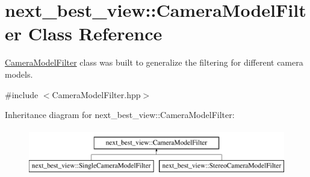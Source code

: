\hypertarget{classnext__best__view_1_1CameraModelFilter}{\section{next\-\_\-best\-\_\-view\-:\-:\-Camera\-Model\-Filter \-Class \-Reference}
\label{classnext__best__view_1_1CameraModelFilter}
}


\hyperlink{classnext__best__view_1_1CameraModelFilter}{\-Camera\-Model\-Filter} class was built to generalize the filtering for different camera models.  




{\ttfamily \#include $<$\-Camera\-Model\-Filter.\-hpp$>$}

\-Inheritance diagram for next\-\_\-best\-\_\-view\-:\-:\-Camera\-Model\-Filter\-:\begin{figure}[H]
\begin{center}
\leavevmode
\includegraphics[height=2.000000cm]{classnext__best__view_1_1CameraModelFilter}
\end{center}
\end{figure}
